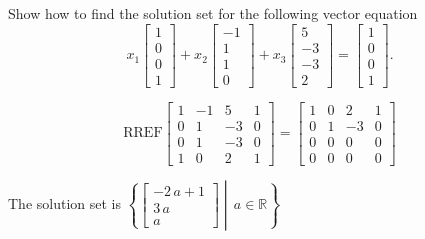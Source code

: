 
\begin{exerciseStatement}


Show how to find the solution set for the following vector equation \[ x_{1} \left[\begin{array}{c}
1 \\
0 \\
0 \\
1
\end{array}\right] + x_{2} \left[\begin{array}{c}
-1 \\
1 \\
1 \\
0
\end{array}\right] + x_{3} \left[\begin{array}{c}
5 \\
-3 \\
-3 \\
2
\end{array}\right] = \left[\begin{array}{c}
1 \\
0 \\
0 \\
1
\end{array}\right] .\]


\end{exerciseStatement}
    
\begin{exerciseAnswer} 
\[\mathrm{RREF} \left[\begin{array}{ccc|c}
1 & -1 & 5 & 1 \\
0 & 1 & -3 & 0 \\
0 & 1 & -3 & 0 \\
1 & 0 & 2 & 1
\end{array}\right]  =  \left[\begin{array}{ccc|c}
1 & 0 & 2 & 1 \\
0 & 1 & -3 & 0 \\
0 & 0 & 0 & 0 \\
0 & 0 & 0 & 0
\end{array}\right] \]

The solution set is \( \left\{ \left[\begin{array}{c}
-2 \, a + 1 \\
3 \, a \\
a
\end{array}\right] \middle|\,a\in\mathbb{R}\right\} \)


\end{exerciseAnswer}
    
